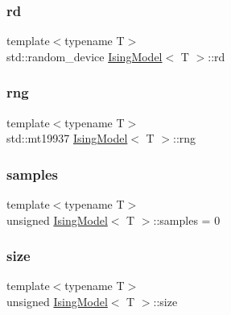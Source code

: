 \subsubsection{\texorpdfstring{rd}{rd}}
{\footnotesize\ttfamily template$<$typename T$>$ \\
std\+::random\+\_\+device \mbox{\hyperlink{classIsingModel}{Ising\+Model}}$<$ T $>$\+::rd\hspace{0.3cm}{\ttfamily [private]}}

\mbox{\label{classIsingModel_a3250275d0897da9f7929b43286e9b44b}} 
\subsubsection{\texorpdfstring{rng}{rng}}
{\footnotesize\ttfamily template$<$typename T$>$ \\
std\+::mt19937 \mbox{\hyperlink{classIsingModel}{Ising\+Model}}$<$ T $>$\+::rng\hspace{0.3cm}{\ttfamily [private]}}

\mbox{\label{classIsingModel_a434e854082ad794811b6e11e2bc50eaf}} 
\subsubsection{\texorpdfstring{samples}{samples}}
{\footnotesize\ttfamily template$<$typename T$>$ \\
unsigned \mbox{\hyperlink{classIsingModel}{Ising\+Model}}$<$ T $>$\+::samples = 0\hspace{0.3cm}{\ttfamily [private]}}

\mbox{\label{classIsingModel_aec6fc4774dda94fd23c6e29d0820b63a}} 
\subsubsection{\texorpdfstring{size}{size}}
{\footnotesize\ttfamily template$<$typename T$>$ \\
unsigned \mbox{\hyperlink{classIsingModel}{Ising\+Model}}$<$ T $>$\+::size\hspace{0.3cm}{\ttfamily [private]}}

